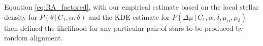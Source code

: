 \documentclass[usenatbib]{mnras}
\newcommand{\given}{\,|\,}
\newcommand{\dd}{\mathrm{d}}
\begin{document}
Equation \ref{eq:RA_factored}, with our empirical estimate based on the local stellar density for $P(\theta \given C_1, \alpha, \delta)$ and the KDE estimate for $P(\Delta \mu \given C_1, \alpha, \delta, \mu_{\alpha}, \mu_{\delta})$ then defined the likelihood for any particular pair of stars to be produced by random alignment.



\begin{comment}
With a detailed knowledge of the three-dimensional stellar density, proper motion distribution as a function of spatial position, and completeness function of the Gaia-TYCHO-2 sample, one could determine $P(\theta, \Delta \mu, \Delta D' \given C_1, \alpha, \delta, \mu_{\alpha}, \mu_{\delta}, D )$ for any arbitrary pair of stars. However, this is a function with complex dependencies that we are not prepared to address here. Instead, we can empirically approximate this probability for every pair of stars in our data set. First, we express $\mu$ as $V_{\rm pec}$ (to remove the correlation between proper motion and distance), and then separate the terms in the probability:
\begin{eqnarray}
P(\theta, \Delta \mu, \Delta D' \given C_1, \alpha, \delta, \mu_{\alpha}, \mu_{\delta}, D ) &=& P(\theta, \Delta V_{\rm pec}, \Delta D' \given C_1, \alpha, \delta, \mu_{\alpha}, \mu_{\delta}, D ) \left| \frac{\dd \Delta V_{\rm pec}}{\dd \Delta \mu} \right| \label{eq:P_obs_noise} \\
&=& P(\theta \given \alpha, \delta) 
  P(\Delta V_{\rm pec} \given \alpha, \delta, \mu_{\alpha}, \mu_{\delta}) \nonumber \\
  & & \qquad \times  P(\Delta D' \given \alpha, \delta, D) \left| \frac{\dd \Delta V_{\rm pec}}{\dd \Delta \mu} \right|. \label{eq:P_obs_noise_split} 
\end{eqnarray}

These terms can be separated so long as no correlation exists between them. There is likely to be some dependence between these terms; for instance at larger distances, farther from the Galactic plane, stars are more likely to be halo members with larger peculiar velocities. A more complex model could account for this, however here we consider such variations to have only a minor effect on the probability in Equation \ref{eq:P_obs_noise}. 


\end{comment}
\end{document}
